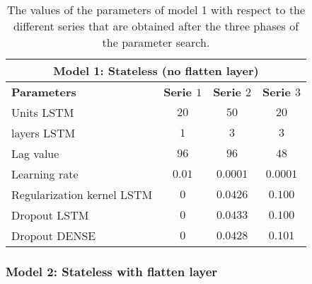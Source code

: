 \begin{table}[ht]
	\centering
	\begin{tabular}{@{}l|ccc@{}} \toprule
		\multicolumn{4}{c}{Model 1: Stateless (no flatten layer)}\\\midrule\midrule
		\textbf{Parameters}	& \textbf{Serie $ 1 $} & \textbf{Serie $ 2 $} & \textbf{Serie $ 3 $}\\\midrule
		Units LSTM & $20 $&$ 50 $  & $20 $\\
		layers LSTM & $1 $&$ 3 $  & $3$\\
		Lag value & $96 $&$ 96$  & $48$\\
		Learning rate & $0.01 $&$ 0.0001$  & $0.0001$\\\hline
		Regularization kernel LSTM   & $ 0 $ & $ 0.0426 $ & $ 0.100 $\\
		Dropout LSTM   & $ 0 $ & $ 0.0433 $ & $ 0.100 $\\
		Dropout DENSE   & $ 0 $ & $ 0.0428 $ & $ 0.101 $\\\bottomrule
	\end{tabular}
	\caption{The values of the parameters of model 1 with respect to the different series that are obtained after the three phases of the parameter search.}
	\label{tab:best_performing_para_final}
\end{table}


\subsubsection{Model 2: Stateless with flatten layer}


